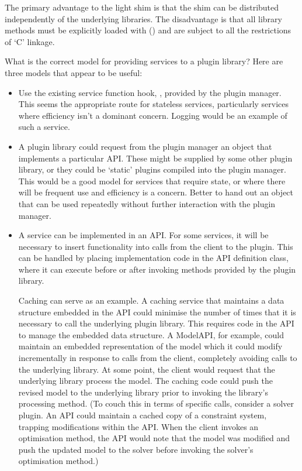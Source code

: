 \documentclass{article}
\begin{document}
The primary advantage to the light shim is that the shim can be distributed
independently of the underlying libraries.
The disadvantage is that all library methods must be explicitly loaded with
 () and are subject to all the restrictions of
`C' linkage.


What is the correct model for providing services to a plugin library?
Here are three models that appear to be useful:
\begin{itemize}
  \item
  Use the existing service function hook, , provided
  by the plugin manager.
  This seems the appropriate route for stateless services, particularly
  services where efficiency isn't a dominant concern.
  Logging would be an example of such a service.

  \item
  A plugin library could request from the plugin manager an object that
  implements a particular API\@.
  These might be supplied by some other plugin library, or they could be
  `static' plugins compiled into the plugin manager.
  This would be a good model for services that require state, or where
  there will be frequent use and efficiency is a concern.
  Better to hand out an object that can be used repeatedly without further
  interaction with the plugin manager.

  \item
  A service can be implemented in an API\@.
  For some services, it will be necessary to insert functionality into
  calls from the client to the plugin.
  This can be handled by placing implementation code in the API definition
  class, where it can execute before or after invoking methods provided by the
  plugin library.

  Caching can serve as an example.
  A caching service that maintains a data structure embedded in the API
  could minimise the number of times
  that it is necessary to call the underlying plugin library.
  This requires code in the API to manage the embedded data structure.
  A ModelAPI, for example, could maintain an embedded representation
  of the model which it could modify incrementally in response to calls from
  the client, completely avoiding calls to the underlying library.
  At some point, the client would request that the underlying library process
  the model.
  The caching code could push the revised model to the underlying library
  prior to invoking the library's processing method.
  (To couch this in terms of specific calls, consider a solver plugin.
  An API could maintain a cached copy of a constraint system, trapping
  modifications within the API.
  When the client invokes an optimisation method, the API would note that
  the model was modified and push the updated model to the solver before
  invoking the solver's optimisation method.)
\end{itemize}




\end{document}
